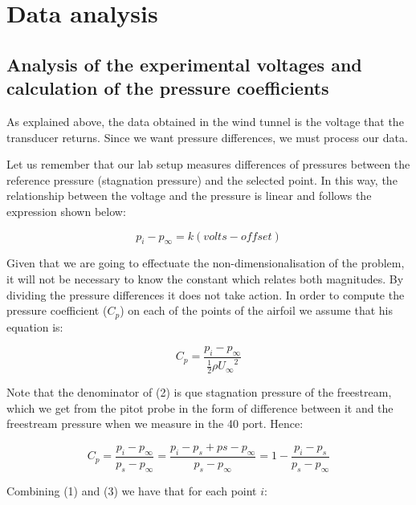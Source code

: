 \documentclass[10pt]{SelfArx} %
\begin{document}

\section{Data analysis}

\subsection{Analysis of the experimental voltages and \\
calculation of the pressure coefficients}

As explained above, the data obtained in the wind tunnel is the voltage that the transducer returns. Since we want pressure differences, we must process our data.

Let us remember that our lab setup measures differences of pressures between the reference pressure (stagnation pressure) and the selected point. In this way, the relationship between the voltage and the pressure is linear and follows the expression shown below: 

\begin{equation} p_{i} - p_{\infty} = k (volts - offset) \end{equation}

Given that we are going to effectuate the non-dimensionalisation of the problem, it will not be necessary to know the constant which relates both magnitudes. By dividing the pressure differences it does not take action. In order to compute the pressure coefficient ($C_{p}$) on each of the points of the airfoil we assume that his equation is: 

\begin{equation} C_{p} = \frac{p_{i} - p_{\infty}}{\frac{1}{2} \rho {U_{\infty}}^{2}} \end{equation}

Note that the denominator of (2) is que stagnation pressure of the freestream, which we get from the pitot probe in the form of difference between it and the freestream pressure when we measure in the 40 port. Hence:

\begin{equation} C_{p} = \frac{p_{i} - p_{\infty}}{p_{s} - p_{\infty}} = \frac{p_{i} - p_{s} + p{s} - p_{\infty}}{p_{s} - p_{\infty}} = 1 - \frac{p_{i} - p_{s}}{p_{s} - p_{\infty}} \end{equation}


Combining (1) and (3) we have that for each point $i$:
\end{document}
